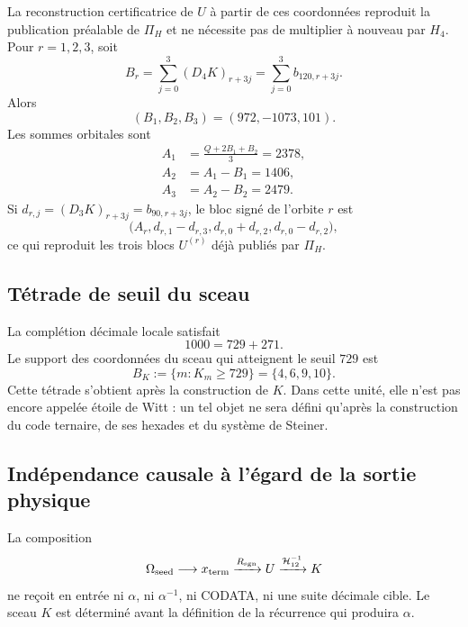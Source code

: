La reconstruction certificatrice de \(U\) à partir de ces coordonnées reproduit la
publication préalable de \(\Pi_H\) et ne nécessite pas de multiplier à nouveau par
\(H_4\). Pour \(r=1,2,3\), soit
\begin{equation}
 B_r=\sum_{j=0}^{3}(D_4K)_{r+3j}
 =\sum_{j=0}^{3}b_{120,r+3j}.
 \label{p3-83-c25-s4:eq:br-diferencias-k}
\end{equation}
Alors
\[
 (B_1,B_2,B_3)=(972,-1073,101).
\]
Les sommes orbitales sont
\begin{align}
 A_1&=\frac{Q+2B_1+B_2}{3}=2378,
 \label{p3-83-c25-s4:eq:a1-reconstruccion-u}\\
 A_2&=A_1-B_1=1406,
 \label{p3-83-c25-s4:eq:a2-reconstruccion-u}\\
 A_3&=A_2-B_2=2479.
 \label{p3-83-c25-s4:eq:a3-reconstruccion-u}
\end{align}
Si \(d_{r,j}=(D_3K)_{r+3j}=b_{90,r+3j}\), le bloc signé de l’orbite
\(r\) est
\begin{equation}
 \bigl(A_r,
 d_{r,1}-d_{r,3},
 d_{r,0}+d_{r,2},
 d_{r,0}-d_{r,2}\bigr),
 \label{p3-83-c25-s4:eq:bloque-firmado-desde-diferencias}
\end{equation}
ce qui reproduit les trois blocs \(U^{(r)}\) déjà publiés par \(\Pi_H\).

\subsection{Tétrade de seuil du sceau}

La complétion décimale locale satisfait
\[
 1000=729+271.
\]
Le support des coordonnées du sceau qui atteignent le seuil \(729\) est
\begin{equation}
 \boxed{
 B_K:=\{m:K_m\geq729\}=\{4,6,9,10\}.}
 \label{p3-83-c25-s4:eq:tetrada-umbral-k}
\end{equation}
Cette tétrade s’obtient après la construction de \(K\). Dans cette unité, elle n’est pas
encore appelée étoile de Witt : un tel objet ne sera défini qu’après
la construction du code ternaire, de ses hexades et du système de Steiner.

\subsection{Indépendance causale à l’égard de la sortie physique}

\begin{theorem}[Isolement de \(U\) et \(K\)]
\label{p3-83-c25-s4:thm:aislamiento-u-k-alpha-codata}
La composition
\begin{equation}
 \Omega_{\rm seed}\longrightarrow x_{\rm term}
 \xrightarrow{R_{\rm sgn}}U
 \xrightarrow{\mathcal H_{12}^{-1}}K
 \label{p3-83-c25-s4:eq:composicion-upstream-u-k}
\end{equation}
ne reçoit en entrée ni \(\alpha\), ni \(\alpha^{-1}\), ni CODATA, ni une suite
décimale cible. Le sceau \(K\) est déterminé avant la définition de la
récurrence qui produira \(\alpha\).
\end{theorem}

